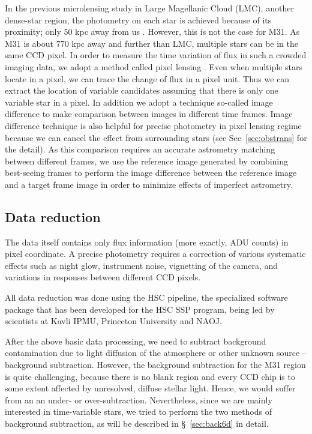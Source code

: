 \documentclass[iop, apj]{emulateapj}
\newcommand{\?}{\stackrel{?}{=}}
\begin{document}


In the previous microlensing study in Large Magellanic Cloud (LMC), another dense-star region, the photometry on each star is achieved because of its proximity; only $50$ kpc away from us \citep{Alcocketal:00}. However, this is not the case for M31. As M31 is about $770$ kpc away and further than LMC, multiple stars can be in the same CCD pixel. 
In order to measure the time variation of flux in such a crowded imaging data, we adopt a method called pixel lensing \citep{AlardLupton:98}. Even when multiple stars locate in a pixel, we can trace the change of flux in a pixel unit. Thus we can extract the location of variable candidates assuming that there is only one variable star in a pixel. In addition we adopt a technique so-called image difference to make comparison between images in different time frames. 
Image difference technique is also helpful for precise photometry in pixel lensing regime because we can cancel the effect from surrounding stars (see Sec~\ref{sec:obstrans} for the detail). As this comparison requires an accurate astrometry matching between different frames, we use the reference image generated by combining best-seeing frames to perform the image difference between the reference image and a target frame image in order to minimize effects of imperfect astrometry. 


\subsection{Data reduction}
\label{sec:obsreduce}
\label{sec:obstrans}
The data itself contains only flux information (more exactly, ADU counts) in pixel coordinate. 
A precise photometry requires a correction of various systematic effects such as night glow, instrument noise, vignetting of the camera, and variations in responses between different CCD pixels.  

All data reduction was done using the HSC pipeline, the specialized software package that has been developed for the HSC SSP program, being led by scientists at Kavli IPMU, Princeton University and NAOJ. 

After the above basic data processing, we need to subtract background contamination due to light diffusion of the atmosphere or other unknown source -- background subtraction. However, the background subtraction for the M31 region is quite challenging, because there is no blank region and every CCD chip is to some extent affected by unresolved, diffuse stellar light. Hence, we would suffer from an an under- or over-subtraction. Nevertheless, since we are mainly interested in time-variable stars, we tried to perform the two methods of background subtraction, as will be described in \S~\ref{sec:back6d} in detail. 
\end{document}
